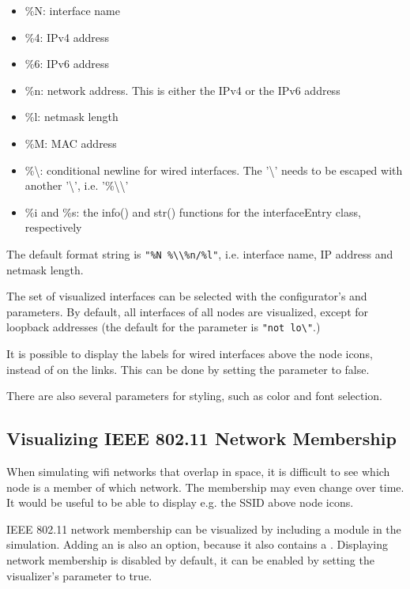 \begin{itemize}
  \item \%N: interface name
  \item \%4: IPv4 address
  \item \%6: IPv6 address
  \item \%n: network address. This is either the IPv4 or the IPv6 address
  \item \%l: netmask length
  \item \%M: MAC address
  \item \%\textbackslash: conditional newline for wired interfaces. The '\textbackslash'
  needs to be escaped with another '\textbackslash', i.e. '\%\textbackslash\textbackslash'
  \item \%i and \%s: the info() and str() functions for the interfaceEntry class, respectively
\end{itemize}

The default format string is
\texttt{"\%N \%\textbackslash\textbackslash\%n/\%l"}, i.e. interface name, IP address and
netmask length.

The set of visualized interfaces can be selected with the configurator's
 and  parameters. By default, all
interfaces of all nodes are visualized, except for loopback addresses (the default for the
 parameter is \texttt{"not lo\textbackslash*"}.)

It is possible to display the labels for wired interfaces above the node icons,
instead of on the links. This can be done by setting the
 parameter to false.

There are also several parameters for styling, such as color and font selection.


\subsection{Visualizing IEEE 802.11 Network Membership}
\label{sec:visualization:ieee-80211-network-membership}

When simulating wifi networks that overlap in space, it is difficult to see
which node is a member of which network. The membership may even change over
time. It would be useful to be able to display e.g. the SSID above node icons.

IEEE 802.11 network membership can be visualized by including a
 module in the simulation. Adding an  is
also an option, because it also contains a . Displaying
network membership is disabled by default, it can be enabled by setting the
visualizer's  parameter to true.


